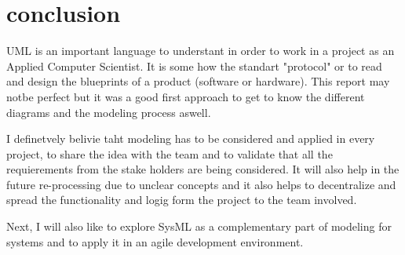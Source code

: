 \documentclass{article}
\begin{document}
            \section{conclusion}
            
            UML is an important language to understant in order to work in a project as an Applied Computer Scientist. It is some how the standart "protocol" or to read and design the blueprints of
            a product (software or hardware). This report may notbe perfect but it was a good first approach to get to know the different diagrams and the modeling process aswell. 
            
            I definetvely belivie taht modeling has to be considered and applied in every project, to share the idea with the team and to validate that all the requierements from the stake holders are being
            considered. It will also help in the future re-processing due to unclear concepts and it also helps to decentralize and spread the functionality and logig form the project to the team involved.
            
            Next, I will also like to explore SysML as a complementary part of modeling for systems and to apply it in an agile development environment. 
            
        
            \newpage
            
            
            \nocite{*}
    
\end{document}
